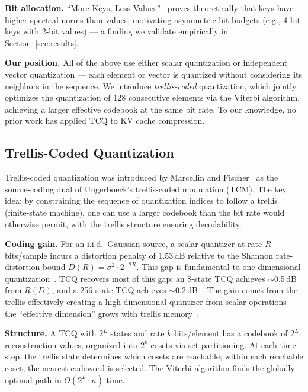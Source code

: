 \documentclass{article}
\begin{document}
\textbf{Bit allocation.}
``More Keys, Less Values''~\cite{morekeyslessvalues2025} proves theoretically
that keys have higher spectral norms than values, motivating asymmetric
bit budgets (e.g., 4-bit keys with 2-bit values) — a finding we validate
empirically in Section~\ref{sec:results}.

\textbf{Our position.} All of the above use either scalar quantization or
independent vector quantization — each element or vector is quantized without
considering its neighbors in the sequence. We introduce \emph{trellis-coded}
quantization, which jointly optimizes the quantization of 128 consecutive
elements via the Viterbi algorithm, achieving a larger effective codebook at
the same bit rate. To our knowledge, no prior work has applied TCQ to KV cache
compression.

\subsection{Trellis-Coded Quantization}
\label{sec:bg_tcq}

Trellis-coded quantization was introduced by Marcellin and
Fischer~\cite{marcellin1990tcq} as the source-coding dual of Ungerboeck's
trellis-coded modulation (TCM). The key idea: by constraining the sequence of
quantization indices to follow a trellis (finite-state machine), one can use a
larger codebook than the bit rate would otherwise permit, with the trellis
structure ensuring decodability.

\textbf{Coding gain.} For an i.i.d.\ Gaussian source, a scalar quantizer at
rate $R$ bits/sample incurs a distortion penalty of 1.53\,dB relative to the
Shannon rate-distortion bound $D(R) = \sigma^2 \cdot 2^{-2R}$. This gap
is fundamental to one-dimensional quantization~\cite{gray1998quantization}.
TCQ recovers most of this gap: an 8-state TCQ achieves $\sim$0.5\,dB from
$R(D)$, and a 256-state TCQ achieves $\sim$0.2\,dB~\cite{fischer1992ectcq}.
The gain comes from the trellis effectively creating a high-dimensional
quantizer from scalar operations — the ``effective dimension'' grows with
trellis memory~\cite{gersho1979,lookabaugh1989}.

\textbf{Structure.} A TCQ with $2^L$ states and rate $k$ bits/element has a
codebook of $2^L$ reconstruction values, organized into $2^k$ cosets via set
partitioning. At each time step, the trellis state determines which cosets are
reachable; within each reachable coset, the nearest codeword is selected. The
Viterbi algorithm finds the globally optimal path in $O(2^L \cdot n)$ time.
\end{document}
